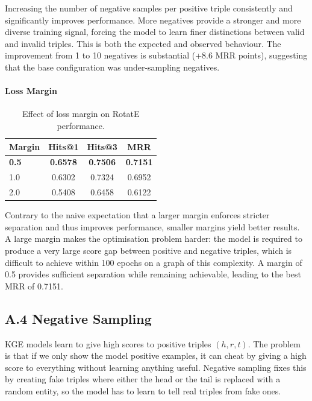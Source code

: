 \documentclass{article}
\begin{document}
  Increasing the number of negative samples per positive triple consistently and
  significantly improves performance. More negatives provide a stronger and more
  diverse training signal, forcing the model to learn finer distinctions between
  valid and invalid triples. This is both the expected and observed behaviour. The
  improvement from 1 to 10 negatives is substantial (+8.6 MRR points), suggesting
  that the base configuration was under-sampling negatives.

  \paragraph{Loss Margin}

  \begin{table}[h]
  \centering
  \begin{tabular}{lccc}
  \hline
  \textbf{Margin} & \textbf{Hits@1} & \textbf{Hits@3} & \textbf{MRR} \\
  \hline
  \textbf{0.5} & \textbf{0.6578} & \textbf{0.7506} & \textbf{0.7151} \\
  1.0 & 0.6302 & 0.7324 & 0.6952 \\
  2.0 & 0.5408 & 0.6458 & 0.6122 \\
  \hline
  \end{tabular}
  \caption{Effect of loss margin on RotatE performance.}
  \end{table}

  Contrary to the naive expectation that a larger margin enforces stricter separation
  and thus improves performance, smaller margins yield better results. A large margin
  makes the optimisation problem harder: the model is required to produce a very large
  score gap between positive and negative triples, which is difficult to achieve within
  100 epochs on a graph of this complexity. A margin of 0.5 provides sufficient
  separation while remaining achievable, leading to the best MRR of 0.7151.

\subsection*{A.4 \hspace{0.3em} Negative Sampling}


  KGE models learn to give high scores to positive triples $(h, r, t)$.
  The problem is that if we only show the model positive examples,
  it can cheat by giving a high score to everything without learning
  anything useful. Negative sampling fixes this by creating fake triples
  where either the head or the tail is replaced with a random entity,
  so the model has to learn to tell real triples from fake ones.
\end{document}
